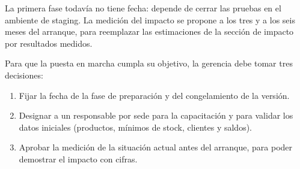 \documentclass[11pt,a4paper]{article}
\begin{document}
La primera fase todavía no tiene fecha: depende de cerrar las pruebas en el ambiente de staging. La medición del impacto se propone a los tres y a los seis meses del arranque, para reemplazar las estimaciones de la sección de impacto por resultados medidos.

Para que la puesta en marcha cumpla su objetivo, la gerencia debe tomar tres decisiones:

\begin{enumerate}
  \item Fijar la fecha de la fase de preparación y del congelamiento de la versión.
  \item Designar a un responsable por sede para la capacitación y para validar los datos iniciales (productos, mínimos de stock, clientes y saldos).
  \item Aprobar la medición de la situación actual antes del arranque, para poder demostrar el impacto con cifras.
\end{enumerate}
\end{document}
